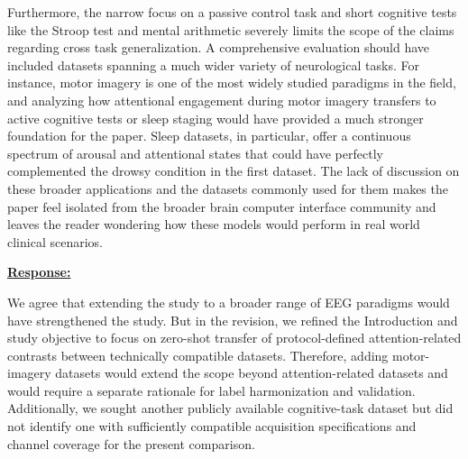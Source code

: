 \documentclass{article}
\begin{document}
\begin{cmt}{}{}

Furthermore, the narrow focus on a passive control task and short cognitive
tests like the Stroop test and mental arithmetic severely limits the scope of
the claims regarding cross task generalization. A comprehensive evaluation
should have included datasets spanning a much wider variety of neurological
tasks. For instance, motor imagery is one of the most widely studied paradigms
in the field, and analyzing how attentional engagement during motor imagery
transfers to active cognitive tests or sleep staging would have provided a much
stronger foundation for the paper. Sleep datasets, in particular, offer a
continuous spectrum of arousal and attentional states that could have perfectly
complemented the drowsy condition in the first dataset. The lack of discussion
on these broader applications and the datasets commonly used for them makes the
paper feel isolated from the broader brain computer interface community and
leaves the reader wondering how these models would perform in real world
clinical scenarios.

\end{cmt}
\vspace{0.1cm}
\noindent
\underline{\textbf{Response:}}
\vspace{0.2cm}

We agree that extending the study to a broader range of EEG paradigms would
have strengthened the study. But in the revision, we refined the Introduction
and study objective to focus on zero-shot transfer of protocol-defined
attention-related contrasts between technically compatible datasets. Therefore,
adding motor-imagery datasets would extend the scope beyond attention-related
datasets and would require a separate rationale for label harmonization and
validation. Additionally, we sought another publicly available cognitive-task
dataset but did not identify one with sufficiently compatible acquisition
specifications and channel coverage for the present comparison.

\vspace{0.3cm}
\end{document}
